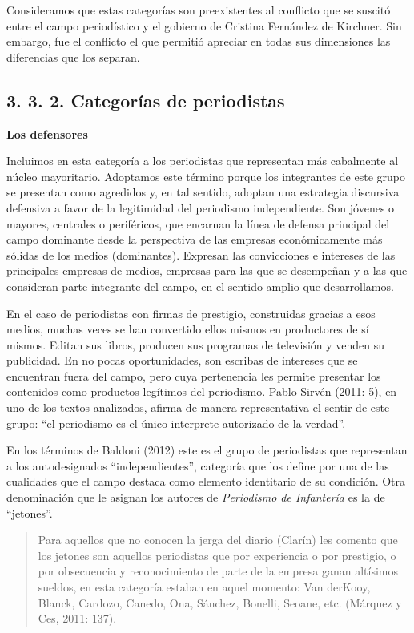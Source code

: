 Consideramos que estas categorías son preexistentes al conflicto que se suscitó entre el campo periodístico y el gobierno de Cristina Fernández de Kirchner. Sin embargo, fue el conflicto el que permitió apreciar en todas sus dimensiones las diferencias que los separan.

\subsection{3. 3. 2. Categorías de periodistas}

\textbf{Los defensores}

Incluimos en esta categoría a los periodistas que representan más cabalmente al núcleo mayoritario. Adoptamos este término porque los integrantes de este grupo se presentan como agredidos y, en tal sentido, adoptan una estrategia discursiva defensiva a favor de la legitimidad del periodismo independiente. Son jóvenes o mayores, centrales o periféricos, que encarnan la línea de defensa principal del campo dominante desde la perspectiva de las empresas económicamente más sólidas de los medios (dominantes). Expresan las convicciones e intereses de las principales empresas de medios, empresas para las que se desempeñan y a las que consideran parte integrante del campo, en el sentido amplio que desarrollamos.

En el caso de periodistas con firmas de prestigio, construidas gracias a esos medios, muchas veces se han convertido ellos mismos en productores de sí mismos. Editan sus libros, producen sus programas de televisión y venden su publicidad. En no pocas oportunidades, son escribas de intereses que se encuentran fuera del campo, pero cuya pertenencia les permite presentar los contenidos como productos legítimos del periodismo. Pablo Sirvén (2011: 5), en uno de los textos analizados, afirma de manera representativa el sentir de este grupo: \enquote{el periodismo es el único interprete autorizado de la verdad}.

En los términos de Baldoni (2012) este es el grupo de periodistas que representan a los autodesignados \enquote{independientes}, categoría que los define por una de las cualidades que el campo destaca como elemento identitario de su condición. Otra denominación que le asignan los autores de \emph{Periodismo de Infantería} es la de \enquote{jetones}.

\begin{quote}
Para aquellos que no conocen la jerga del diario (Clarín) les comento que los jetones son aquellos periodistas que por experiencia o por prestigio, o por obsecuencia y reconocimiento de parte de la empresa ganan altísimos sueldos, en esta categoría estaban en aquel momento: Van derKooy, Blanck, Cardozo, Canedo, Ona, Sánchez, Bonelli, Seoane, etc. (Márquez y Ces, 2011: 137).
\end{quote}

